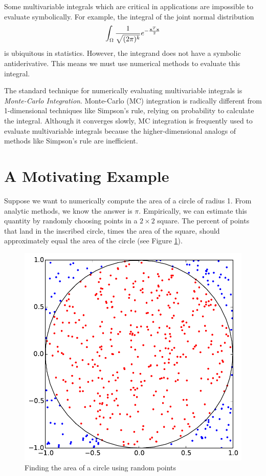 
Some multivariable integrals which are critical in applications are impossible to evaluate symbolically.
For example, the integral of the joint normal distribution
\[
\int_{\Omega} \frac{1}{\sqrt{(2 \pi)^k}} e^{- \frac{\bold{x}^T\bold{x}}{2}}
\]
is ubiquitous in statistics.
However, the integrand does not have a symbolic antiderivative.
This means we must use numerical methods to evaluate this integral.

The standard technique for numerically evaluating multivariable integrals is \emph{Monte-Carlo Integration}.
Monte-Carlo (MC) integration is radically different from 1-dimensional techniques like Simpson's rule, relying on probability to calculate the integral.
Although it converges slowly, MC integration is frequently used to evaluate multivariable integrals because the higher-dimensional analogs of methods like Simpson's rule are inefficient. 

\section*{A Motivating Example}
Suppose we want to numerically compute the area of a circle of radius 1.
From analytic methods, we know the answer is $\pi$.
Empirically, we can estimate this quantity by randomly choosing points in a $2 \times 2$ square.
The percent of points that land in the inscribed circle, times the area of the square, should approximately equal the area of the circle (see Figure \ref{fig:MCCircle}).

\begin{figure}
\includegraphics[width=.7\textwidth]{MC_Circle.pdf}
\caption{Finding the area of a circle using random points}
\label{fig:MCCircle}
\end{figure}

